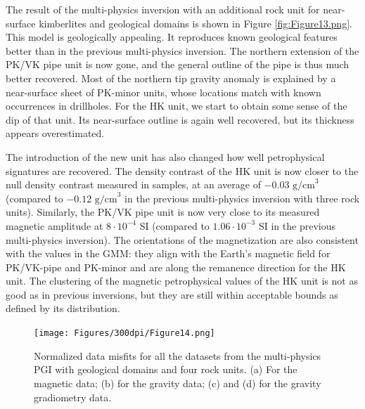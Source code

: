 \documentclass[paper, twocolumn]{geophysics} %
\begin{document}
The result of the multi-physics inversion with an additional rock unit for near-surface kimberlites and geological domains is shown in Figure \ref{fig:Figure13.png}. This model is geologically appealing. It reproduces known geological features better than in the previous multi-physics inversion. The northern extension of the PK/VK pipe unit is now gone, and the general outline of the pipe is thus much better recovered. Most of the northern tip gravity anomaly is explained by a near-surface sheet of PK-minor units, whose locations match with known occurrences in drillholes. For the HK unit, we start to obtain some sense of the dip of that unit. Its near-surface outline is again well recovered, but its thickness appears overestimated.

The introduction of the new unit has also changed how well petrophysical signatures are recovered. The density contrast of the HK unit is now closer to the null density contrast measured in samples, at an average of $-0.03 \text{ g/cm}^3$ (compared to $-0.12 \text{ g/cm}^3$ in the previous multi-physics inversion with three rock units). Similarly, the PK/VK pipe unit is now very close to its measured magnetic amplitude at $8\cdot 10^{-4}$ SI (compared to $1.06 \cdot 10^{-3}$ SI in the previous multi-physics inversion). The orientations of the magnetization are also consistent with the values in the GMM: they align with the Earth's magnetic field for PK/VK-pipe and PK-minor and are along the remanence direction for the HK unit. The clustering of the magnetic petrophysical values of the HK unit is not as good as in previous inversions, but they are still within acceptable bounds as defined by its distribution.



\begin{figure}[!ht]
\centering
\texttt{[image: Figures/300dpi/Figure14.png]}
\caption{Normalized data misfits for all the datasets from the multi-physics PGI with geological domains and four rock units. (a) For the magnetic data; (b) for the gravity data; (c) and (d) for the gravity gradiometry data.}
\label{fig:Figure14.png}
\end{figure}
\end{document}
